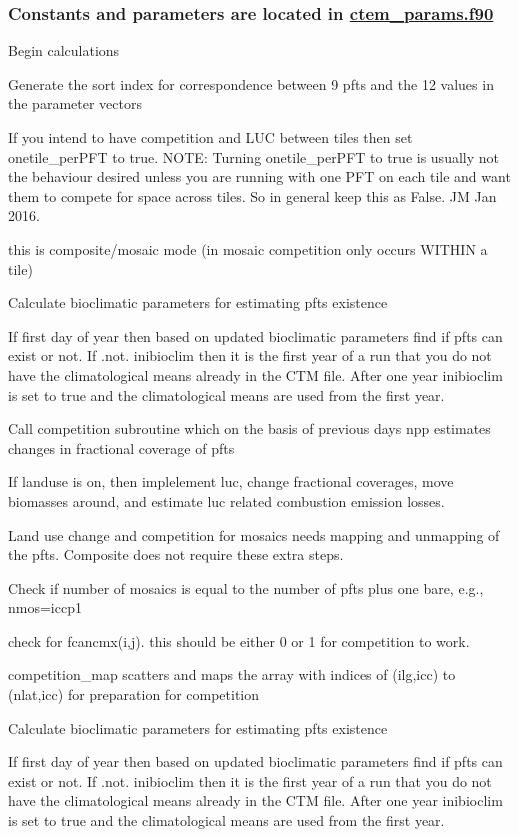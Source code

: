  \subsubsection*{Constants and parameters are located in \hyperlink{ctem__params_8f90}{ctem\+\_\+params.\+f90} }

Begin calculations

Generate the sort index for correspondence between 9 pfts and the 12 values in the parameter vectors

If you intend to have competition and L\+U\+C between tiles then set onetile\+\_\+per\+P\+F\+T to true. N\+O\+T\+E\+: Turning onetile\+\_\+per\+P\+F\+T to true is usually not the behaviour desired unless you are running with one P\+F\+T on each tile and want them to compete for space across tiles. So in general keep this as False. J\+M Jan 2016.

this is composite/mosaic mode (in mosaic competition only occurs W\+I\+T\+H\+I\+N a tile)

Calculate bioclimatic parameters for estimating pfts existence

If first day of year then based on updated bioclimatic parameters find if pfts can exist or not. If .not. inibioclim then it is the first year of a run that you do not have the climatological means already in the C\+T\+M file. After one year inibioclim is set to true and the climatological means are used from the first year.

Call competition subroutine which on the basis of previous day\textquotesingle{}s npp estimates changes in fractional coverage of pfts

If landuse is on, then implelement luc, change fractional coverages, move biomasses around, and estimate luc related combustion emission losses.

Land use change and competition for mosaics needs mapping and unmapping of the pfts. Composite does not require these extra steps.

Check if number of mosaics is equal to the number of pfts plus one bare, e.\+g., nmos=iccp1

check for fcancmx(i,j). this should be either 0 or 1 for competition to work.

competition\+\_\+map scatters and maps the array with indices of (ilg,icc) to (nlat,icc) for preparation for competition

Calculate bioclimatic parameters for estimating pfts existence

If first day of year then based on updated bioclimatic parameters find if pfts can exist or not. If .not. inibioclim then it is the first year of a run that you do not have the climatological means already in the C\+T\+M file. After one year inibioclim is set to true and the climatological means are used from the first year.

